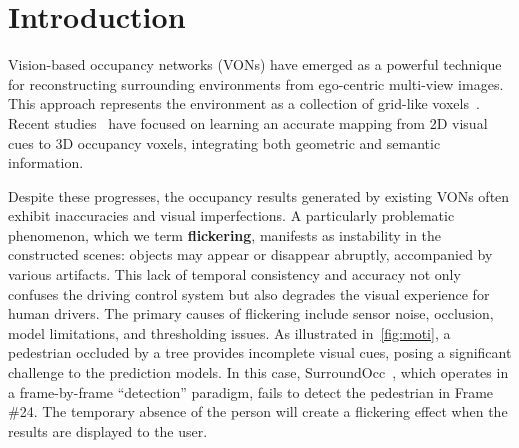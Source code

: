 \section{Introduction}
\label{sec:intro}

Vision-based occupancy networks (VONs) have emerged as a powerful technique for reconstructing surrounding environments from ego-centric multi-view images. This approach represents the environment as a collection of grid-like voxels~\cite{Occ3D}. Recent studies~\cite{BEVFormer,OccFormer,TPVFormer,VoxFormer,surroundOcc} have focused on learning an accurate mapping from 2D visual cues to 3D occupancy voxels, integrating both geometric and semantic information.

Despite these progresses, the occupancy results generated by existing VONs often exhibit inaccuracies and visual imperfections. A particularly problematic phenomenon, which we term {\bf flickering}, manifests as instability in the constructed scenes: objects may appear or disappear abruptly, accompanied by various artifacts. This lack of temporal consistency and accuracy not only confuses the driving control system but also degrades the visual experience for human drivers. The primary causes of flickering include sensor noise, occlusion, model limitations, and thresholding issues. As illustrated in~\cref{fig:moti}, a pedestrian occluded by a tree provides incomplete visual cues, posing a significant challenge to the prediction models. In this case, SurroundOcc~\cite{surroundOcc}, which operates in a frame-by-frame ``detection'' paradigm, fails to detect the pedestrian in Frame \#24. The temporary absence of the person will create a flickering effect when the results are displayed to the user.


